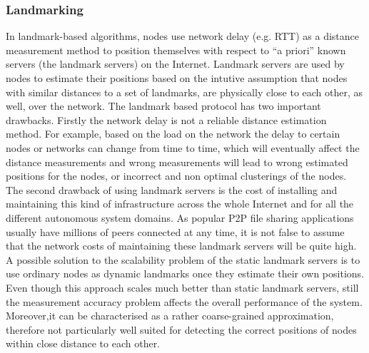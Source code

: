 \subsubsection{Landmarking}\label{sec:landmark}
In landmark-based algorithms, nodes use network delay (e.g. RTT) as a
distance measurement method to position themselves with respect to ``a priori''
known servers (the landmark servers) on the Internet. Landmark servers are used
by nodes to estimate their positions based on the intutive assumption that nodes
with similar distances to a set of landmarks, are physically close to each
other, as well, over the network. The landmark based protocol has two important
drawbacks. Firstly the network delay is not a reliable distance estimation
method. For example, based on the load on the network the delay to certain nodes
or networks can change from time to time, which will eventually affect the
distance measurements and wrong measurements will lead to wrong estimated
positions for the nodes, or incorrect and non optimal clusterings of the nodes.
The second drawback of using landmark servers is the cost of installing and
maintaining this kind of infrastructure across the whole Internet and for all
the different autonomous system domains. As popular P2P file sharing
applications usually have millions of peers connected at any time, it is not
false to assume that the network costs of maintaining these landmark servers
will be quite high. A possible solution to the scalability problem of the static
landmark servers is to use ordinary nodes as dynamic landmarks once they
estimate their own positions. Even though this approach scales much better than
static landmark servers, still the measurement accuracy problem affects the
overall performance of the system. Moreover,it can be characterised as a rather
coarse-grained approximation, therefore not particularly well suited for
detecting the correct positions of nodes within close distance to each other.

